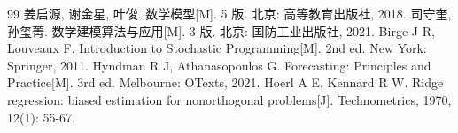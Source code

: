 
\begin{thebibliography}{99}
\small
\setlength{\itemsep}{0pt}\setlength{\parsep}{0pt}\setlength{\parskip}{0pt}%
 姜启源, 谢金星, 叶俊. 数学模型[M]. 5 版. 北京: 高等教育出版社, 2018.
 司守奎, 孙玺菁. 数学建模算法与应用[M]. 3 版. 北京: 国防工业出版社, 2021.
 Birge J R, Louveaux F. Introduction to Stochastic Programming[M]. 2nd ed. New York: Springer, 2011.
 Hyndman R J, Athanasopoulos G. Forecasting: Principles and Practice[M]. 3rd ed. Melbourne: OTexts, 2021.
 Hoerl A E, Kennard R W. Ridge regression: biased estimation for nonorthogonal problems[J]. Technometrics, 1970, 12(1): 55-67.
\end{thebibliography}

